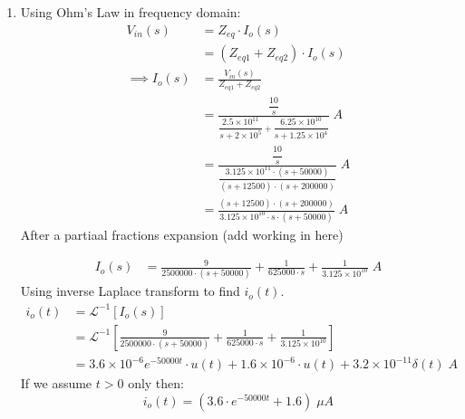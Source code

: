 \begin{enumerate}
	\item{
		Using Ohm's Law in frequency domain:
		\begin{align*}
		V_{in}(s) &= Z_{eq} \cdot I_o(s)\\
		&= (Z_{eq1} + Z_{eq2}) \cdot I_o(s)\\
		\implies I_o(s) &= \frac{V_{in}(s)}{Z_{eq1} + Z_{eq2}}\\
		&= \frac{\dfrac{10}{s}} 
		{\dfrac{2.5 \times 10^{11}}
		{s + 2 \times 10^5} + \dfrac{6.25 \times 10^{10}}{s + 1.25 \times 10^4}} \; A\\
		&= \frac{\dfrac{10}{s}} 
		{\dfrac{3.125 \times 10^{11} \cdot (s + 50000)}{(s+12500)\cdot(s+200000)}} \; A\\
		&= \frac{(s+12500)\cdot(s+200000)}{3.125 \times 10^{10} \cdot s \cdot (s + 50000)} \; A
		\end{align*}
		After a partiaal fractions expansion (add working in here)
		
		\begin{align*}
		I_o(s) &= \frac{9}{2500000 \cdot(s+50000)} + \frac{1}{625000 \cdot s} 
		+ \frac{1}{3.125 \times 10^{10}} \; A
		\end{align*}
		Using inverse Laplace transform to find $i_o(t)$.
		\begin{align*}
		i_o(t) &= \mathcal{L}^{-1}\left[ I_o(s) \right]\\
		&= \mathcal{L}^{-1} \left[ \frac{9}{2500000 \cdot(s+50000)} 
		+ \frac{1}{625000 \cdot s} + \frac{1}{3.125 \times 10^{10}} \right]\\
		&= 3.6 \times 10^{-6} e^{-50000t} \cdot u(t) + 1.6 \times 10^{-6} \cdot u(t) + 3.2 \times 10^{-11} \delta(t) \; A
		\end{align*}
		If we assume $t>0$ only then:
		$$ i_o(t) = (3.6 \cdot e^{-50000t} + 1.6) \; \mu A $$
		\\
	}

\end{enumerate}
